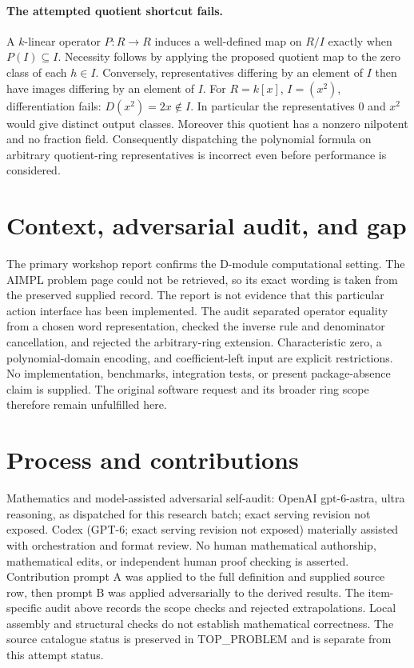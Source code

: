 \documentclass[11pt]{article}
\begin{document}
\paragraph{The attempted quotient shortcut fails.}
A $k$-linear operator $P:R\to R$ induces a well-defined map on $R/I$ exactly
when $P(I)\subseteq I$. Necessity follows by applying the proposed quotient
map to the zero class of each $h\in I$. Conversely, representatives differing
by an element of $I$ then have images differing by an element of $I$.
For $R=k[x]$, $I=(x^2)$, differentiation fails: $D(x^2)=2x\notin I$.
In particular the representatives $0$ and $x^2$ would give distinct output
classes. Moreover this quotient has a nonzero nilpotent and no fraction field.
Consequently dispatching the polynomial formula on arbitrary quotient-ring
representatives is incorrect even before performance is considered.

\section{Context, adversarial audit, and gap}
The primary workshop report confirms the D-module computational setting.
The AIMPL problem page could not be retrieved, so its exact wording is taken
from the preserved supplied record. The report is not evidence that this
particular action interface has been implemented. The audit separated
operator equality from a chosen word representation, checked the inverse
rule and denominator cancellation, and rejected the arbitrary-ring extension.
Characteristic zero, a polynomial-domain encoding, and coefficient-left input
are explicit restrictions. No implementation, benchmarks, integration tests,
or present package-absence claim is supplied. The original software request
and its broader ring scope therefore remain unfulfilled here.

\section{Process and contributions}
Mathematics and model-assisted adversarial self-audit: OpenAI gpt-6-astra, ultra reasoning, as dispatched for this research batch; exact serving revision not exposed. Codex (GPT-6; exact serving revision not exposed) materially assisted with orchestration and format review. No human mathematical authorship, mathematical edits, or independent human proof checking is asserted.
Contribution prompt A was applied to the full definition and supplied source row, then prompt B was applied adversarially to the derived results. The item-specific audit above records the scope checks and rejected extrapolations. Local assembly and structural checks do not establish mathematical correctness. The source catalogue status is preserved in TOP\_PROBLEM and is separate from this attempt status.
\end{document}
